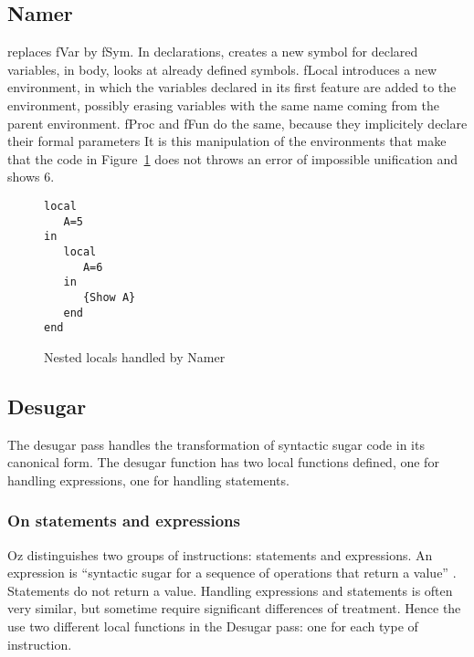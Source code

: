 \documentclass[a4paper]{memoir}
\begin{document}
\subsection{Namer}
replaces fVar by fSym. In declarations, creates a new symbol for declared variables, in body, looks at already defined symbols.
fLocal introduces a new environment, in which the variables declared in its first feature are added to the environment, possibly erasing variables with the same name coming from the parent environment.
fProc and fFun do the same, because they implicitely declare their formal parameters %
It is this manipulation of the environments that make that the code in Figure~\ref{fig:namer_nested_locals} does not throws an error of impossible unification and shows 6.
\begin{figure}
\begin{lstlisting}
local
   A=5
in
   local 
      A=6
   in
      {Show A}
   end
end
\end{lstlisting}
\caption{Nested locals handled by Namer}
\label{fig:namer_nested_locals}
\end{figure}

\subsection{Desugar}\label{section:desugar}
The desugar pass handles the transformation of syntactic sugar code in its canonical form.
The desugar function has two local functions defined, one for handling expressions, one for handling statements.
\subsubsection{On statements and expressions}
Oz distinguishes two groups of instructions: statements and expressions. An expression is ``syntactic sugar for a sequence of operations that return a value'' . Statements do not return a value.
Handling expressions and statements is often very similar, but sometime require significant differences of treatment. Hence the use two different local functions in the Desugar pass: one for each type of instruction.
\end{document}
